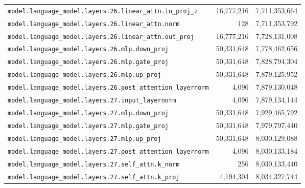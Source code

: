 \documentclass[10pt,a4paper]{article}
\theoremstyle{definition}
\begin{document}
\begin{appendices}
\begin{longtable}{p{9.5cm}rr}
\texttt{model.\allowbreak{}language\_model.\allowbreak{}layers.\allowbreak{}26.\allowbreak{}linear\_attn.\allowbreak{}in\_proj\_z} & 16,777,216 & 7,711,353,664 \\
\texttt{model.\allowbreak{}language\_model.\allowbreak{}layers.\allowbreak{}26.\allowbreak{}linear\_attn.\allowbreak{}norm} & 128 & 7,711,353,792 \\
\texttt{model.\allowbreak{}language\_model.\allowbreak{}layers.\allowbreak{}26.\allowbreak{}linear\_attn.\allowbreak{}out\_proj} & 16,777,216 & 7,728,131,008 \\
\texttt{model.\allowbreak{}language\_model.\allowbreak{}layers.\allowbreak{}26.\allowbreak{}mlp.\allowbreak{}down\_proj} & 50,331,648 & 7,778,462,656 \\
\texttt{model.\allowbreak{}language\_model.\allowbreak{}layers.\allowbreak{}26.\allowbreak{}mlp.\allowbreak{}gate\_proj} & 50,331,648 & 7,828,794,304 \\
\texttt{model.\allowbreak{}language\_model.\allowbreak{}layers.\allowbreak{}26.\allowbreak{}mlp.\allowbreak{}up\_proj} & 50,331,648 & 7,879,125,952 \\
\texttt{model.\allowbreak{}language\_model.\allowbreak{}layers.\allowbreak{}26.\allowbreak{}post\_attention\_layernorm} & 4,096 & 7,879,130,048 \\
\texttt{model.\allowbreak{}language\_model.\allowbreak{}layers.\allowbreak{}27.\allowbreak{}input\_layernorm} & 4,096 & 7,879,134,144 \\
\texttt{model.\allowbreak{}language\_model.\allowbreak{}layers.\allowbreak{}27.\allowbreak{}mlp.\allowbreak{}down\_proj} & 50,331,648 & 7,929,465,792 \\
\texttt{model.\allowbreak{}language\_model.\allowbreak{}layers.\allowbreak{}27.\allowbreak{}mlp.\allowbreak{}gate\_proj} & 50,331,648 & 7,979,797,440 \\
\texttt{model.\allowbreak{}language\_model.\allowbreak{}layers.\allowbreak{}27.\allowbreak{}mlp.\allowbreak{}up\_proj} & 50,331,648 & 8,030,129,088 \\
\texttt{model.\allowbreak{}language\_model.\allowbreak{}layers.\allowbreak{}27.\allowbreak{}post\_attention\_layernorm} & 4,096 & 8,030,133,184 \\
\texttt{model.\allowbreak{}language\_model.\allowbreak{}layers.\allowbreak{}27.\allowbreak{}self\_attn.\allowbreak{}k\_norm} & 256 & 8,030,133,440 \\
\texttt{model.\allowbreak{}language\_model.\allowbreak{}layers.\allowbreak{}27.\allowbreak{}self\_attn.\allowbreak{}k\_proj} & 4,194,304 & 8,034,327,744 \\

\end{longtable}
\end{appendices}
\end{document}
